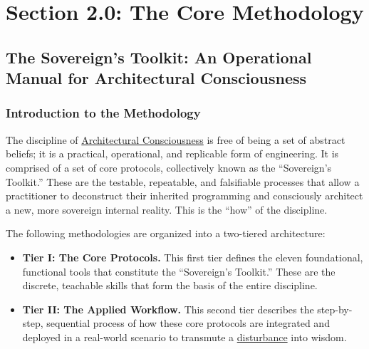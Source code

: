 \documentclass{article}
\begin{document}


\section*{Section 2.0: The Core Methodology}
\subsection*{The Sovereign's Toolkit: An Operational Manual for Architectural Consciousness}
\subsubsection*{Introduction to the Methodology}

The discipline of \hyperlink{gloss:architectural_consciousness}{Architectural Consciousness} is free of being a set of abstract beliefs; it is a practical, operational, and replicable form of engineering. It is comprised of a set of core protocols, collectively known as the ``Sovereign's Toolkit.'' These are the testable, repeatable, and falsifiable processes that allow a practitioner to deconstruct their inherited programming and consciously architect a new, more sovereign internal reality. This is the ``how'' of the discipline.

The following methodologies are organized into a two-tiered architecture:

\begin{itemize}
    \item \textbf{Tier I: The Core Protocols.} This first tier defines the eleven foundational, functional tools that constitute the ``Sovereign's Toolkit.'' These are the discrete, teachable skills that form the basis of the entire discipline.

    \item \textbf{Tier II: The Applied Workflow.} This second tier describes the step-by-step, sequential process of how these core protocols are integrated and deployed in a real-world scenario to transmute a \hyperlink{gloss:disturbance}{disturbance} into wisdom.
\end{itemize}
\end{document}
